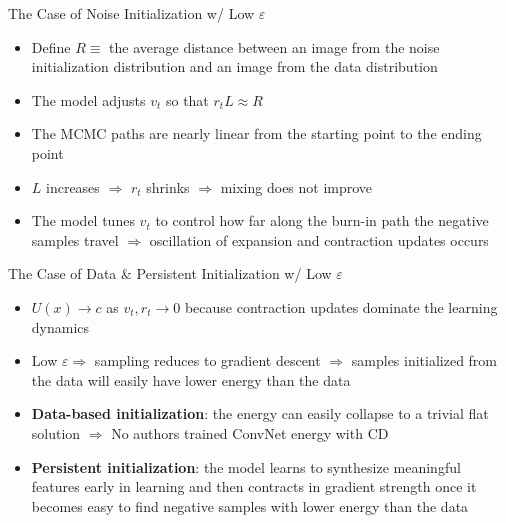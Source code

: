 \documentclass{beamer}
\begin{document}
\begin{frame}{The Case of Noise Initialization w/ Low $\varepsilon$}
\begin{itemize}
\item Define $R\equiv$ the average distance between an
image from the noise initialization distribution and an image
from the data distribution
\item The model adjusts $v_t$ so that $r_tL\approx R$
\item The MCMC paths are nearly linear from the starting point to the ending point
\item $L$ increases $\Rightarrow$ $r_t$ shrinks $\Rightarrow$ mixing does not improve
\item The model tunes $v_t$ to control how far along the burn-in path the negative samples travel $\Rightarrow$ oscillation of expansion and contraction updates occurs
\end{itemize}
\end{frame}

\begin{frame}{The Case of Data \& Persistent Initialization w/ Low $\varepsilon$}
\begin{itemize}
\item $U(x)\to c$ as $v_t,r_t\to 0$ because contraction
updates dominate the learning dynamics
\item Low $\varepsilon\Rightarrow$ sampling reduces to gradient descent $\Rightarrow$ samples
initialized from the data will easily have lower energy
than the data
\item \textbf{Data-based initialization}: the energy can easily collapse to a trivial flat
solution $\Rightarrow$ No authors trained ConvNet energy with CD
\item \textbf{Persistent initialization}: the model learns to synthesize
meaningful features early in learning and then contracts
in gradient strength once it becomes easy to find negative
samples with lower energy than the data
\end{itemize}
\end{frame}
\end{document}
